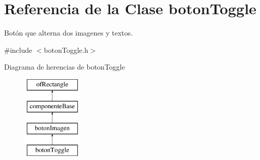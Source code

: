 \hypertarget{classboton_toggle}{}\section{Referencia de la Clase boton\+Toggle}
\label{classboton_toggle}


Botón que alterna dos imagenes y textos.  




{\ttfamily \#include $<$boton\+Toggle.\+h$>$}

Diagrama de herencias de boton\+Toggle\begin{figure}[H]
\begin{center}
\leavevmode
\includegraphics[height=4.000000cm]{classboton_toggle}
\end{center}
\end{figure}
